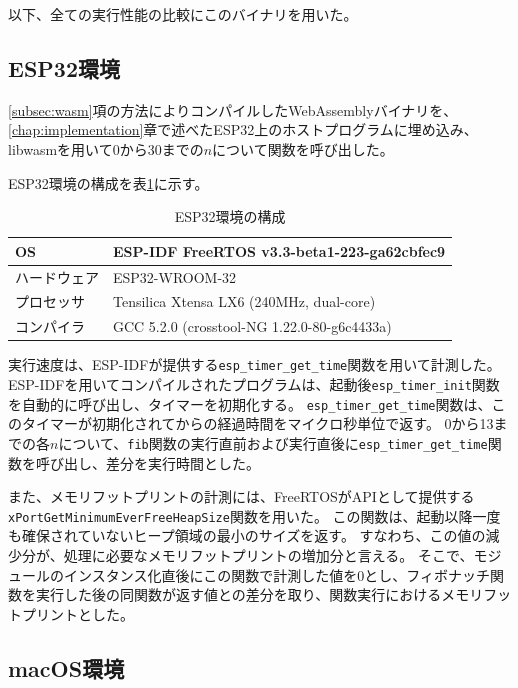 以下、全ての実行性能の比較にこのバイナリを用いた。

\subsection{ESP32環境}

\ref{subsec:wasm}項の方法によりコンパイルしたWebAssemblyバイナリを、\ref{chap:implementation}章で述べたESP32上のホストプログラムに埋め込み、libwasmを用いて0から30までの$n$について関数を呼び出した。

ESP32環境の構成を表\ref{tab:spec}に示す。

\begin{table}[htbp]
  \label{tab:spec}
  \caption{ESP32環境の構成}
  \begin{center}
    \begin{tabular}{|l|l|}
    \hline
    OS & ESP-IDF FreeRTOS v3.3-beta1-223-ga62cbfec9 \\ \hline
    ハードウェア & ESP32-WROOM-32 \\ \hline
    プロセッサ & Tensilica Xtensa LX6 (240MHz, dual-core) \\ \hline
    コンパイラ & GCC 5.2.0 (crosstool-NG 1.22.0-80-g6c4433a) \\ \hline
    \end{tabular}
  \end{center}
\end{table}

実行速度は、ESP-IDFが提供する\verb|esp_timer_get_time|関数を用いて計測した。
ESP-IDFを用いてコンパイルされたプログラムは、起動後\verb|esp_timer_init|関数を自動的に呼び出し、タイマーを初期化する。
\verb|esp_timer_get_time|関数は、このタイマーが初期化されてからの経過時間をマイクロ秒単位で返す。
0から13までの各$n$について、\verb|fib|関数の実行直前および実行直後に\verb|esp_timer_get_time|関数を呼び出し、差分を実行時間とした。

また、メモリフットプリントの計測には、FreeRTOSがAPIとして提供する \\
\verb|xPortGetMinimumEverFreeHeapSize|関数を用いた。
この関数は、起動以降一度も確保されていないヒープ領域の最小のサイズを返す。
すなわち、この値の減少分が、処理に必要なメモリフットプリントの増加分と言える。
そこで、モジュールのインスタンス化直後にこの関数で計測した値を0とし、フィボナッチ関数を実行した後の同関数が返す値との差分を取り、関数実行におけるメモリフットプリントとした。

\subsection{macOS環境}

